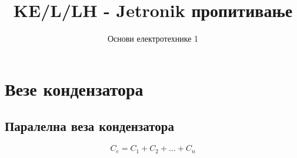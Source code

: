 \documentclass[12pt]{article}
\title{KE/L/LH - Jetronik пропитивање}
\author{Основи електротехнике 1}
\date{}
\begin{document}
\maketitle

\section{Везе кондензатора}

\subsection{Паралелна веза кондензатора}

\begin{kljucno}
\[
C_e = C_1 + C_2 + \dots + C_n
\]
\end{kljucno}
\end{document}
